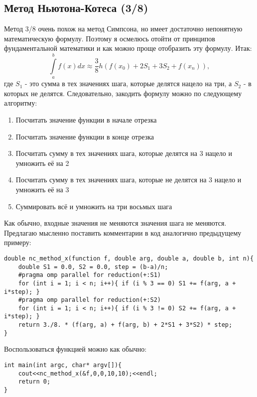 \documentclass{article}
\begin{document}
\subsection{Метод Ньютона-Котеса (3/8)}
Метод 3/8 очень похож на метод Симпсона, но имеет достаточно непонятную математическую формулу. Поэтому я осмелюсь отойти от принципов фундаментальной математики и как можно проще отобразить эту формулу. Итак:
$$\int\limits_a^b f(x)dx \approx \frac{3}{8}h(f(x_0)+2S_1+3S_2+f(x_n)),$$
где $S_1$ - это сумма в тех значениях шага, которые делятся нацело на три, а $S_2$ - в которых не делятся. Следовательно, закодить формулу можно по следующему алгоритму:
\begin{enumerate}
    \item Посчитать значение функции в начале отрезка
    \item Посчитать значение функции в конце отрезка
    \item Посчитать сумму в тех значениях шага, которые делятся на 3 нацело и умножить её на 2
    \item Посчитать сумму в тех значениях шага, которые не делятся на 3 нацело и умножить её на 3
    \item Суммировать всё и умножить на три восьмых шага
\end{enumerate}
Как обычно, входные значения не меняются значения шага не меняются. Предлагаю мысленно поставить комментарии в код аналогично предыдущему примеру:
\begin{lstlisting}
double nc_method_x(function f, double arg, double a, double b, int n){
    double S1 = 0.0, S2 = 0.0, step = (b-a)/n;
    #pragma omp parallel for reduction(+:S1)
    for (int i = 1; i < n; i++){ if (i % 3 == 0) S1 += f(arg, a + i*step); }
    #pragma omp parallel for reduction(+:S2)
    for (int i = 1; i < n; i++){ if (i % 3 != 0) S2 += f(arg, a + i*step); }
    return 3./8. * (f(arg, a) + f(arg, b) + 2*S1 + 3*S2) * step;
}
\end{lstlisting}
Воспользоваться функцией можно как обычно:
\begin{lstlisting}
int main(int argc, char* argv[]){
    cout<<nc_method_x(&f,0,0,10,10);<<endl;
    return 0;
}
\end{lstlisting}
\end{document}
